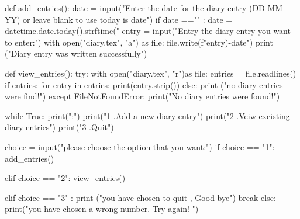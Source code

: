 
def add_entries():
  date = input("Enter the date for the diary entry (DD-MM-YY) or leave blank to use today is date")
  if date =="" :
    date = datetime.date.today().strftime("%
  entry = input("Entry the diary entry you want to enter:")
  with open("diary.tex", "a") as file:
    file.write(f"{entry})-{date}")
  print ("Diary entry was written successfully") 
  
def view_entries():
  try:
    with open("diary.tex", "r")as file:
      entries = file.readlines()
      if entries:
        for entry in entries:
          print(entry.strip())
      else:
          print ("no diary entries were find!")
  except FileNotFoundError:
    print("No diary entries were found!")
  
  
while True:
  print("\nMenu:")
  print("1 .Add a new diary entry")
  print("2 .Veiw excisting  diary entries")
  print("3 .Quit")
  
  choice = input("please choose the option that you want:")
  if choice == "1":
    add_entries()
    
  elif choice == "2":
    view_entries() 
    
  elif choice == "3" :
    print ("you have chosen to quit , Good bye")
    break
  else:
    print("you have chosen a wrong number. Try again! ")
    
    
